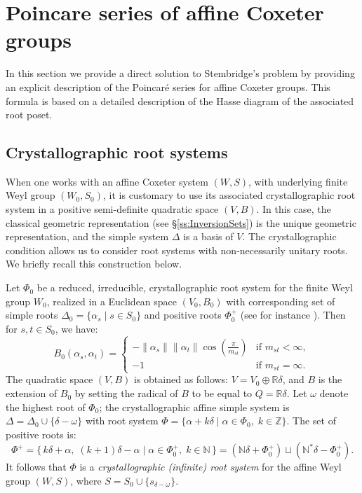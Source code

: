 \documentclass{amsart}
\theoremstyle{definition}
\begin{document}
\section{Poincare series of affine Coxeter groups}\label{se:affine}
In this section we provide a direct solution to Stembridge’s problem by providing an explicit description of the Poincaré series for affine Coxeter groups. This formula is based on a detailed description of the Hasse diagram of the associated root poset.

\subsection{Crystallographic root systems}

When one works with an affine Coxeter system $(W,S)$, with underlying finite Weyl group $(W_0,S_0)$, it is customary to use its associated crystallographic root system in a positive semi-definite quadratic space $(V,B)$. In this case, the classical geometric representation (see \S\ref{ss:InversionSets}) is the unique geometric representation, and  the simple system $\Delta$ is a basis of $V$. The crystallographic condition allows us to consider root systems with non-necessarily unitary roots. We briefly recall this construction below. 


Let $\Phi_0$ be a reduced, irreducible, crystallographic root system for the finite
Weyl group $W_0$, realized in a Euclidean space $(V_0,B_0)$ with corresponding set of simple roots $\Delta_0=\{\alpha_s\mid s\in S_0\}$ and positive roots $\Phi_0^+$ (see for instance \cite{bour,Hum}). Then for $s,t\in S_0$, we have:
\[
B_0(\alpha_s, \alpha_t) = 
\begin{cases} 
-\|\alpha_s\| \|\alpha_t\| \cos \left(\frac{\pi}{m_{st}}\right) & \text{if } m_{st} < \infty, \\
-1 & \text{if } m_{st} = \infty.
\end{cases}
\]
The quadratic space $(V,B)$ is obtained as follows:  $V = V_0 \oplus \mathbb{R}\delta$, and $B$ is the extension of  $B_0$ by setting the radical of $B$ to be equal to  $Q = \mathbb{R}\delta$. Let $\omega$ denote the highest root of $\Phi_0$; the crystallographic affine simple system is $\Delta = \Delta_0 \cup \{ \delta - \omega \}$ with root system 
$\Phi = \{ \alpha + k\delta \mid \alpha \in \Phi_0,\; k \in \mathbb{Z} \}$.
The set of positive roots is:
\[\Phi^+=
\{\,  k\delta + \alpha,\;  (k+1)\delta -\alpha \mid \alpha \in \Phi_0^+,\; k \in \mathbb{N} \,\}=(\mathbb{N}\delta+\Phi^+_0)\sqcup (\mathbb{N}^*\delta-\Phi^+_0).
\]
It follows that $\Phi$ is a {\em crystallographic (infinite) root system} for the affine Weyl group $(W,S)$, where $S=S_0 \cup \{s_{\delta-\omega}\}$.
\end{document}
